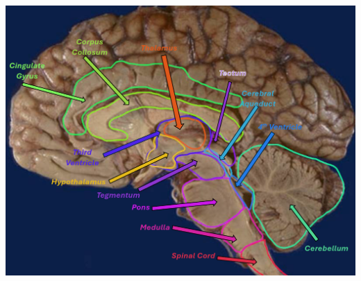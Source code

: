\begin{landscape}
    \pagestyle{plain}
    \pagecolor{brainbackground}
    \centering
    \includegraphics[width=.95\paperwidth,height=.95\paperheight,keepaspectratio]{images/midsagital_labeled.png}
  \end{landscape}